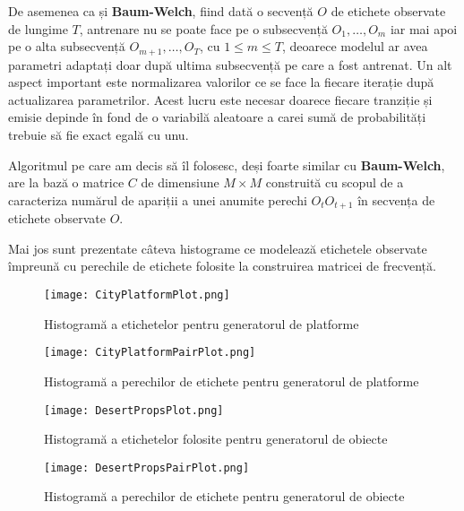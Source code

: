 De asemenea ca și \textbf{Baum-Welch}, fiind dată o secvență $O$ de etichete observate de lungime $T$, antrenare nu se poate face pe o subsecvență $O_{1},\dots,O_{m}$ iar mai apoi pe o alta subsecvență $O_{m+1},\dots,O_{T}$, cu $1 \leq m \leq T$, deoarece modelul ar avea parametri adaptați doar după ultima subsecvență pe care a fost antrenat. Un alt aspect important este normalizarea valorilor ce se face la fiecare iterație după actualizarea parametrilor. Acest lucru este necesar doarece fiecare tranziție și emisie depinde în fond de o variabilă aleatoare a carei sumă de probabilități trebuie să fie exact egală cu unu.\par

Algoritmul pe care am decis să îl folosesc, deși foarte similar cu \textbf{Baum-Welch}, are la bază o matrice $C$ de dimensiune $M\times M$ construită cu scopul de a caracteriza numărul de apariții a unei anumite perechi $O_{t}O_{t+1}$ în secvența de etichete observate $O$.\par

Mai jos sunt prezentate câteva histograme ce modelează etichetele observate împreună cu perechile de etichete folosite la construirea matricei de frecvență.\par

\vspace{10mm}
\begin{figure}[H]
\centering
\texttt{[image: CityPlatformPlot.png]} \par
\caption{Histogramă a etichetelor pentru generatorul de platforme}
\end{figure}

\vspace{10mm}
\begin{figure}[H]
\centering
\texttt{[image: CityPlatformPairPlot.png]} \par
\caption{Histogramă a perechilor de etichete pentru generatorul de platforme}
\end{figure}

\vspace{10mm}
\begin{figure}[H]
\centering
\texttt{[image: DesertPropsPlot.png]} \par
\caption{Histogramă a etichetelor folosite pentru generatorul de obiecte}
\end{figure}


\vspace{10mm}
\begin{figure}[H]
\centering
\texttt{[image: DesertPropsPairPlot.png]} \par
\caption{Histogramă a perechilor de etichete pentru generatorul de obiecte}
\end{figure}


